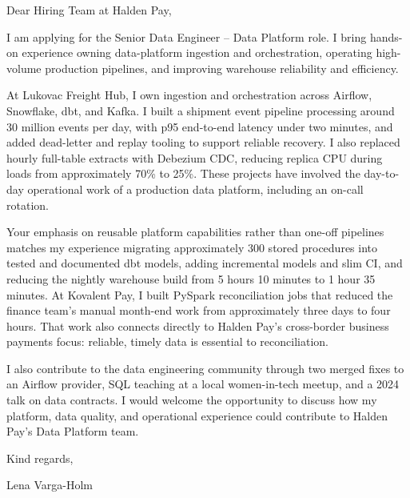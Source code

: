 \documentclass[11pt,a4paper]{article}
\begin{document}
Dear Hiring Team at Halden Pay,

I am applying for the Senior Data Engineer – Data Platform role. I bring hands-on experience owning data-platform ingestion and orchestration, operating high-volume production pipelines, and improving warehouse reliability and efficiency.

At Lukovac Freight Hub, I own ingestion and orchestration across Airflow, Snowflake, dbt, and Kafka. I built a shipment event pipeline processing around 30 million events per day, with p95 end-to-end latency under two minutes, and added dead-letter and replay tooling to support reliable recovery. I also replaced hourly full-table extracts with Debezium CDC, reducing replica CPU during loads from approximately 70\% to 25\%. These projects have involved the day-to-day operational work of a production data platform, including an on-call rotation.

Your emphasis on reusable platform capabilities rather than one-off pipelines matches my experience migrating approximately 300 stored procedures into tested and documented dbt models, adding incremental models and slim CI, and reducing the nightly warehouse build from 5 hours 10 minutes to 1 hour 35 minutes. At Kovalent Pay, I built PySpark reconciliation jobs that reduced the finance team's manual month-end work from approximately three days to four hours. That work also connects directly to Halden Pay's cross-border business payments focus: reliable, timely data is essential to reconciliation.

I also contribute to the data engineering community through two merged fixes to an Airflow provider, SQL teaching at a local women-in-tech meetup, and a 2024 talk on data contracts. I would welcome the opportunity to discuss how my platform, data quality, and operational experience could contribute to Halden Pay's Data Platform team.

Kind regards,

Lena Varga-Holm
\end{document}
